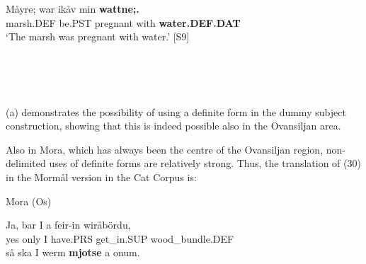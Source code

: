\item 


 \ea\label{}
\gll Måyre;  war  ikåv  min  \textbf{wattne;.}\\


marsh.DEF  be.PST  pregnant  with  \textbf{water.DEF.DAT}\\

\glt ‘The marsh was pregnant with water.’ [S9]

\z

\ea%
    \label{ex:45}
    \\
    \gll\\
	\\
    \glt     \z

	(a) demonstrates the possibility of using a definite form in the dummy subject construction, showing that this is indeed possible also in the Ovansiljan area. 


Also in Mora, which has always been the centre of the Ovansiljan region, non-delimited uses of definite forms are relatively strong. Thus, the translation of (30) in the Mormål version in the Cat Corpus is:


\item 

Mora (Os)



 \ea\label{}
\gll Ja,  bar  I  a  feir-in  wiråbördu,\\


yes  only  I  have.PRS  get\_in.SUP  wood\_bundle.DEF\\

 \ea\label{}
\gll så  ska  I  werm  \textbf{mjotse} a  onum.\\


